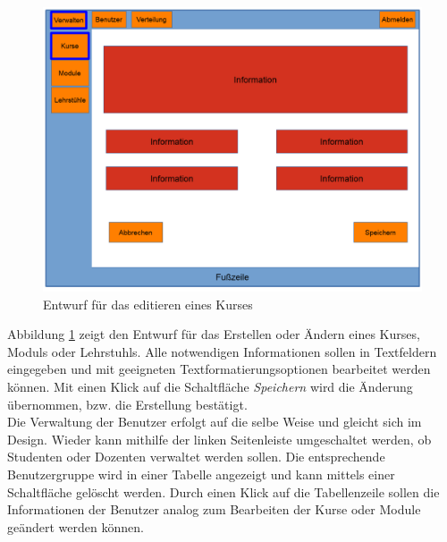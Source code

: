             \begin{figure}[t]
                \centering
                \includegraphics[width=\textwidth]{./design/images/MockUpsBackend/backendEdit.png}
                \caption{Entwurf für das editieren eines Kurses}
                \label{fig:mockupEdit}
            \end{figure}
              
        	Abbildung \ref{fig:mockupEdit} zeigt den Entwurf für das Erstellen oder Ändern eines Kurses, Moduls oder Lehrstuhls.
        	Alle notwendigen Informationen sollen in Textfeldern eingegeben und mit geeigneten Textformatierungsoptionen bearbeitet werden können.
        	Mit einen Klick auf die Schaltfläche \textit{Speichern} wird die Änderung übernommen, bzw. die Erstellung bestätigt.\\
        	
        	Die Verwaltung der Benutzer erfolgt auf die selbe Weise und gleicht sich im Design.
        	Wieder kann mithilfe der linken Seitenleiste umgeschaltet werden, ob Studenten oder Dozenten verwaltet werden sollen.
        	Die entsprechende Benutzergruppe wird in einer Tabelle angezeigt und kann mittels einer Schaltfläche gelöscht werden.
        	Durch einen Klick auf die Tabellenzeile sollen die Informationen der Benutzer analog zum Bearbeiten der Kurse oder Module  geändert werden können.\\
            
